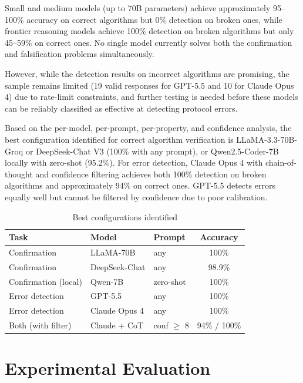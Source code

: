 \documentclass[conference]{IEEEtran}
\begin{document}
Small and medium models (up to 70B parameters) achieve approximately 95--100\% accuracy on correct algorithms but 0\% detection on broken ones, while frontier reasoning models achieve 100\% detection on broken algorithms but only 45--59\% on correct ones. No single model currently solves both the confirmation and falsification problems simultaneously.

However, while the detection results on incorrect algorithms are promising, the sample remains limited (19 valid responses for GPT-5.5 and 10 for Claude Opus 4) due to rate-limit constraints, and further testing is needed before these models can be reliably classified as effective at detecting protocol errors.

Based on the per-model, per-prompt, per-property, and confidence analysis, the best configuration identified for correct algorithm verification is LLaMA-3.3-70B-Groq or DeepSeek-Chat V3 (100\% with any prompt), or Qwen2.5-Coder-7B locally with zero-shot (95.2\%). For error detection, Claude Opus 4 with chain-of-thought and confidence filtering achieves both 100\% detection on broken algorithms and approximately 94\% on correct ones. GPT-5.5 detects errors equally well but cannot be filtered by confidence due to poor calibration.

\begin{table}[h]
\centering
\caption{Best configurations identified}
\label{tab:best-configs}
\begin{tabular}{|l|l|l|c|}
\hline
\textbf{Task} & \textbf{Model} & \textbf{Prompt} & \textbf{Accuracy} \\
\hline
Confirmation & LLaMA-70B & any & 100\% \\
Confirmation & DeepSeek-Chat & any & 98.9\% \\
Confirmation (local) & Qwen-7B & zero-shot & 100\% \\
Error detection & GPT-5.5 & any & 100\% \\
Error detection & Claude Opus 4 & any & 100\% \\
Both (with filter) & Claude + CoT & conf $\geq$ 8 & 94\% / 100\% \\
\hline
\end{tabular}
\end{table}



\section{Experimental Evaluation}
\end{document}

